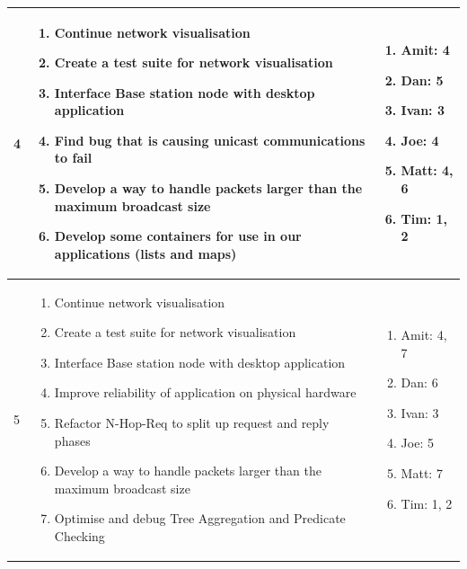 \begin{center}
\begin{longtable}{| l | p{7.5cm} | p{5cm} |}
	4 & \begin{enumerate}
		\item Continue network visualisation
		\item Create a test suite for network visualisation
		\item Interface Base station node with desktop application
		\item Find bug that is causing unicast communications to fail
		\item Develop a way to handle packets larger than the maximum broadcast size
		\item Develop some containers for use in our applications (lists and maps)
		\end{enumerate} &
	\begin{enumerate}
		\item[] Amit: 4
		\item[] Dan: 5
		\item[] Ivan: 3
		\item[] Joe: 4
		\item[] Matt: 4, 6
		\item[] Tim: 1, 2
	\end{enumerate}
	\\ \hline

	5 & \begin{enumerate}
		\item Continue network visualisation
		\item Create a test suite for network visualisation
		\item Interface Base station node with desktop application
		\item Improve reliability of application on physical hardware
		\item Refactor N-Hop-Req to split up request and reply phases
		\item Develop a way to handle packets larger than the maximum broadcast size
		\item Optimise and debug Tree Aggregation and Predicate Checking
		\end{enumerate} &
	\begin{enumerate}
		\item[] Amit: 4, 7
		\item[] Dan: 6
		\item[] Ivan: 3
		\item[] Joe: 5
		\item[] Matt: 7
		\item[] Tim: 1, 2
	\end{enumerate}
	\\ \hline


\end{longtable}
\end{center}
